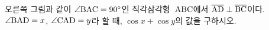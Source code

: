\noindent\begin{minipage}[t]{0.58\linewidth}\vspace{0pt}\raggedright 오른쪽 그림과 같이 $\angle\mathrm{BAC}=90^\circ$인 직각삼각형~$\mathrm{ABC}$에서 $\overline{\mathrm{AD}}\perp\overline{\mathrm{BC}}$이다. $\angle\mathrm{BAD}=x$, $\angle\mathrm{CAD}=y$라 할 때, $\cos x+\cos y$의 값을 구하시오.\end{minipage}\hfill\begin{minipage}[t]{0.4\linewidth}\vspace{0pt}\centering \resizebox{\ifdim\width>\linewidth\linewidth\else\width\fi}{!}{}\end{minipage}\par
